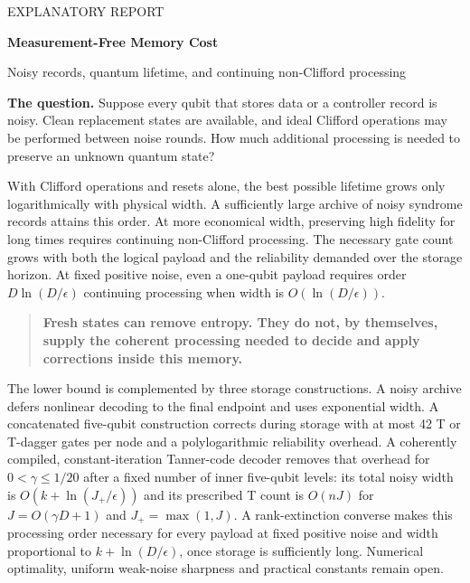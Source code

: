 \documentclass[11pt,a4paper]{article}
\numberwithin{equation}{section}
\theoremstyle{remark}\newtheorem*{remark}{Interpretation}
\newcommand{\eps}{\epsilon}
\newcommand{\keypoint}[1]{\begin{quote}\color{ink}\textbf{#1}\end{quote}}
\begin{document}
\thispagestyle{empty}
{\color{blue}\large EXPLANATORY REPORT}\par\vspace{8mm}
{\color{ink}\LARGE\bfseries Measurement-Free Memory Cost\par}
\vspace{3mm}
{\large Noisy records, quantum lifetime, and continuing non-Clifford processing\par}
\vspace{6mm}
\textbf{The question.} Suppose every qubit that stores data or a controller record is noisy. Clean replacement states are available, and ideal Clifford operations may be performed between noise rounds. How much additional processing is needed to preserve an unknown quantum state?

With Clifford operations and resets alone, the best possible lifetime grows only logarithmically with physical width. A sufficiently large archive of noisy syndrome records attains this order. At more economical width, preserving high fidelity for long times requires continuing non-Clifford processing. The necessary gate count grows with both the logical payload and the reliability demanded over the storage horizon. At fixed positive noise, even a one-qubit payload requires order $D\ln(D/\eps)$ continuing processing when width is $O(\ln(D/\eps))$.

\keypoint{Fresh states can remove entropy. They do not, by themselves, supply the coherent processing needed to decide and apply corrections inside this memory.}

The lower bound is complemented by three storage constructions. A noisy archive defers nonlinear decoding to the final endpoint and uses exponential width. A concatenated five-qubit construction corrects during storage with at most 42 T or T-dagger gates per node and a polylogarithmic reliability overhead. A coherently compiled, constant-iteration Tanner-code decoder removes that overhead for $0<\gamma\le1/20$ after a fixed number of inner five-qubit levels: its total noisy width is $O(k+\ln(J_+/\eps))$ and its prescribed T count is $O(nJ)$ for $J=O(\gamma D+1)$ and $J_+=\max(1,J)$. A rank-extinction converse makes this processing order necessary for every payload at fixed positive noise and width proportional to $k+\ln(D/\eps)$, once storage is sufficiently long. Numerical optimality, uniform weak-noise sharpness and practical constants remain open.
\end{document}
